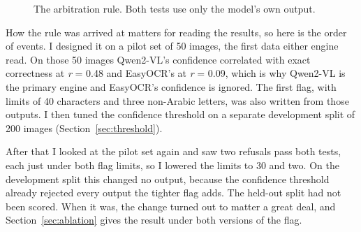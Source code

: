 \documentclass[11pt,a4paper]{article}
\begin{document}
\begin{figure}[!htb]
\centering
{}
\caption{The arbitration rule. Both tests use only the model's own output.}
\label{fig:pipeline}
\end{figure}

How the rule was arrived at matters for reading the results, so here is the
order of events. I designed it on a pilot set of 50 images, the first data
either engine read. On those 50 images Qwen2-VL's confidence correlated with
exact correctness at \emph{r} = 0.48 and EasyOCR's at \emph{r} = 0.09, which is why
Qwen2-VL is the primary engine and EasyOCR's confidence is ignored. The first
flag, with limits of 40 characters and three non-Arabic letters, was also
written from those outputs. I then tuned the confidence threshold on a
separate development split of 200 images (Section~\ref{sec:threshold}).

After that I looked at the pilot set again and saw two refusals pass both
tests, each just under both flag limits, so I lowered the limits to 30 and
two. On the development split this changed no output, because the confidence
threshold already rejected every output the tighter flag adds. The held-out
split had not been scored. When it was, the change turned out to matter a
great deal, and Section~\ref{sec:ablation} gives the result under both
versions of the flag.
\end{document}
